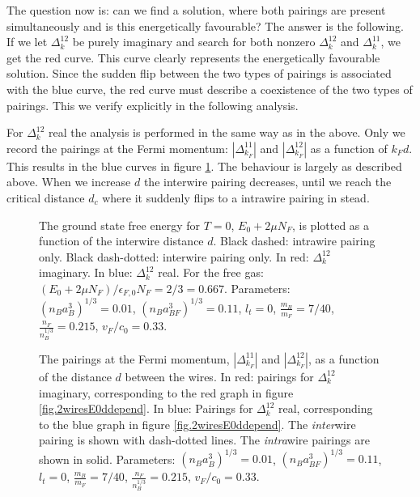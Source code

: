 The question now is: can we find a solution, where both pairings are present simultaneously and is this energetically favourable? The answer is the following. If we let $\Delta^{12}_k$ be purely imaginary and search for both nonzero $\Delta^{12}_k$ and $\Delta^{11}_k$, we get the red curve. This curve clearly represents the energetically favourable solution. Since the sudden flip between the two types of pairings is associated with the blue curve, the red curve must describe a coexistence of the two types of pairings. This we verify explicitly in the following analysis. 

For $\Delta^{12}_k$ real the analysis is performed in the same way as in the above. Only we record the pairings at the Fermi momentum: $\left|\Delta^{11}_{k_F}\right|$ and $\left|\Delta^{12}_{k_F}\right|$ as a function of $k_Fd$. This results in the blue curves in figure \ref{fig.2wiresMaximalPairingddepend}. The behaviour is largely as described above. When we increase $d$ the interwire pairing decreases, until we reach the critical distance $d_c$ where it suddenly flips to a intrawire pairing in stead. 

\begin{figure} 
\begin{center}  
  
\caption{The ground state free energy for $T = 0$, $E_0 + 2\mu N_F$, is plotted as a function of the interwire distance $d$. Black dashed: intrawire pairing only. Black dash-dotted: interwire pairing only. In red: $\Delta^{12}_k$ imaginary. In blue: $\Delta^{12}_k$ real. For the free gas: $(E_0 + 2\mu N_F)/\epsilon_{F,0}N_F = 2/3 = 0.667$. Parameters: $(n_Ba_B^3)^{1/3} = 0.01$, $(n_Ba_{BF}^3)^{1/3} = 0.11$, $l_t = 0$, $\frac{m_B}{m_F} = 7/40$, $\frac{n_F}{n_B^{1/3}} = 0.215$, $v_F/c_0 = 0.33$. }  
\label{fig.2wiresE0ddepend}  

  
\caption{The pairings at the Fermi momentum, $\left|\Delta^{11}_{k_F}\right|$ and $\left|\Delta^{12}_{k_F}\right|$, as a function of the distance $d$ between the wires. In red: pairings for $\Delta^{12}_k$ imaginary, corresponding to the red graph in figure \ref{fig.2wiresE0ddepend}. In blue: Pairings for $\Delta^{12}_k$ real, corresponding to the blue graph in figure \ref{fig.2wiresE0ddepend}. The \textit{inter}wire pairing is shown with dash-dotted lines. The \textit{intra}wire pairings are shown in solid. Parameters: $(n_Ba_B^3)^{1/3} = 0.01$, $(n_Ba_{BF}^3)^{1/3} = 0.11$, $l_t = 0$, $\frac{m_B}{m_F} = 7/40$, $\frac{n_F}{n_B^{1/3}} = 0.215$, $v_F/c_0 = 0.33$. }  
\label{fig.2wiresMaximalPairingddepend}  
\end{center}    
\end{figure}

